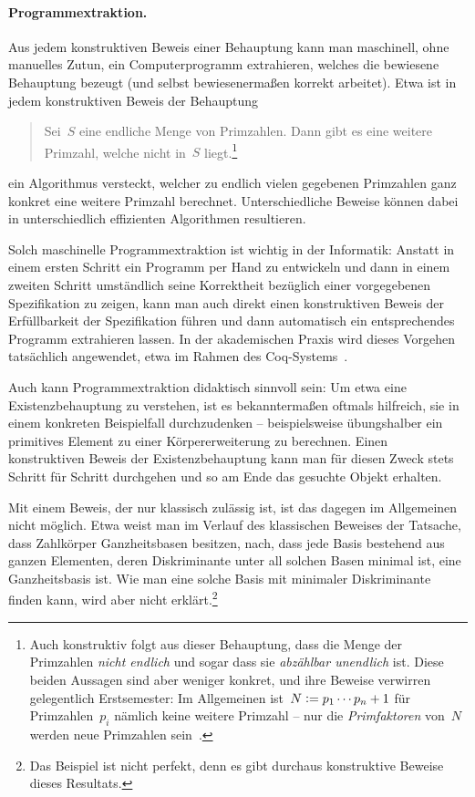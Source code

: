 \documentclass[a4paper,ngerman,12pt]{scrartcl}
\theoremstyle{definition}
\theoremstyle{plain}
\theoremstyle{remark}
\renewcommand{\_}{\mathpunct{.}\,}
\newcommand{\?}{\,{:}\,}
\newcommand{\defeq}{\vcentcolon=}
\begin{document}
\paragraph{Programmextraktion.} Aus jedem konstruktiven Beweis einer Behauptung
kann man maschinell, ohne manuelles Zutun, ein Computerprogramm extrahieren,
welches die bewiesene Behauptung bezeugt (und selbst bewiesenermaßen korrekt
arbeitet). Etwa ist in jedem konstruktiven Beweis der Behauptung
\begin{quote}Sei~$S$ eine endliche Menge von Primzahlen. Dann gibt es eine
weitere Primzahl, welche nicht in~$S$ liegt.\footnote{Auch konstruktiv folgt
aus dieser Behauptung, dass die Menge der Primzahlen \emph{nicht endlich} und
sogar dass sie \emph{abzählbar unendlich} ist. Diese beiden Aussagen sind aber
weniger konkret, und ihre Beweise verwirren gelegentlich Erstsemester: Im
Allgemeinen ist~$N \defeq p_1 \cdots p_n + 1$ für Primzahlen~$p_i$ nämlich keine weitere
Primzahl -- nur die \emph{Primfaktoren} von~$N$ werden neue Primzahlen
sein~\cite{hardy:woodgold:prime-simplicity}.}
\end{quote}
ein Algorithmus versteckt, welcher zu endlich vielen gegebenen Primzahlen
ganz konkret eine weitere Primzahl berechnet. Unterschiedliche Beweise können
dabei in unterschiedlich effizienten Algorithmen resultieren.

Solch maschinelle
Programmextraktion ist wichtig in der Informatik: Anstatt in einem ersten
Schritt ein Programm per Hand zu entwickeln und dann in einem zweiten
Schritt umständlich seine Korrektheit bezüglich einer vorgegebenen
Spezifikation zu zeigen, kann man auch direkt einen konstruktiven Beweis der
Erfüllbarkeit der Spezifikation führen und dann automatisch ein entsprechendes
Programm extrahieren lassen. In der akademischen Praxis wird dieses Vorgehen
tatsächlich angewendet, etwa im Rahmen des Coq-Systems~\cite{coq:manual}.

Auch kann Programmextraktion didaktisch sinnvoll sein: Um etwa eine
Existenzbehauptung zu verstehen, ist es bekanntermaßen oftmals hilfreich, sie in einem konkreten
Beispielfall durchzudenken -- beispielsweise übungshalber ein primitives
Element zu einer Körpererweiterung zu berechnen. Einen konstruktiven Beweis der Existenzbehauptung
kann man für diesen Zweck stets Schritt für Schritt durchgehen und so am Ende das gesuchte
Objekt erhalten.

Mit einem Beweis, der nur klassisch zulässig ist, ist das
dagegen im Allgemeinen nicht möglich. Etwa weist man im Verlauf des klassischen
Beweises der Tatsache, dass Zahlkörper Ganzheitsbasen besitzen, nach, dass jede Basis bestehend
aus ganzen Elementen, deren Diskriminante unter all solchen Basen minimal ist,
eine Ganzheitsbasis ist. Wie man eine solche Basis mit minimaler Diskriminante
finden kann, wird aber nicht erklärt.\footnote{Das Beispiel ist nicht perfekt,
denn es gibt durchaus konstruktive Beweise dieses Resultats.}
\end{document}
